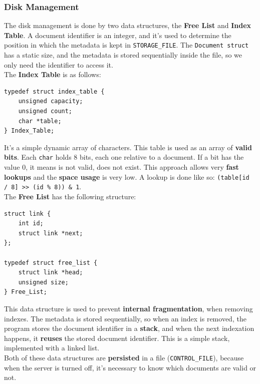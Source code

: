 \documentclass[a4paper, 11pt]{article}
\begin{document}
\subsubsection{Disk Management}

The disk management is done by two data structures, the \textbf{Free List} and \textbf{Index Table}. A document identifier is an integer, and it's used to determine the position in which the metadata is kept in \texttt{STORAGE\_FILE}. The \texttt{Document struct} has a static size, and the metadata is stored sequentially inside the file, so we only need the identifier to access it.\\

\noindent The \textbf{Index Table} is as follows:

\begin{Verbatim}[xleftmargin=2em]
typedef struct index_table {
    unsigned capacity;
    unsigned count;
    char *table;
} Index_Table;
\end{Verbatim}

\noindent It's a simple dynamic array of characters. This table is used as an array of \textbf{valid bits}. Each \texttt{char} holds 8 bits, each one relative to a document. If a bit has the value 0, it means is not valid, does not exist. This approach allows very \textbf{fast lookups} and the \textbf{space usage} is very low. A lookup is done like so: \texttt{(table[id / 8] >> (id \% 8)) \& 1}.\\

\noindent The \textbf{Free List} has the following structure:

\begin{Verbatim}[xleftmargin=2em]
struct link {
    int id;
    struct link *next;
};

typedef struct free_list {
    struct link *head;
    unsigned size;
} Free_List;
\end{Verbatim}

\noindent This data structure is used to prevent \textbf{internal fragmentation}, when removing indexes. The metadata is stored sequentially, so when an index is removed, the program stores the document identifier in a \textbf{stack}, and when the next indexation happens, it \textbf{reuses} the stored document identifier. This is a simple stack, implemented with a linked list.\\

\noindent Both of these data structures are \textbf{persisted} in a file (\texttt{CONTROL\_FILE}), because when the server is turned off, it's necessary to know which documents are valid or not.
\end{document}
